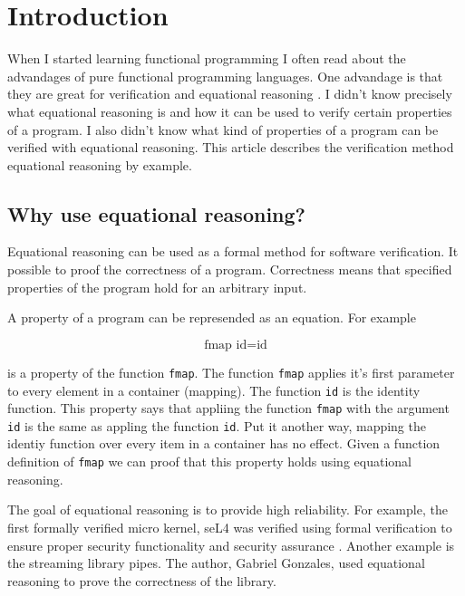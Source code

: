 \section{Introduction}
\label{sec:This}

When I started learning functional programming I often read about the advandages of pure functional programming languages. One advandage is that they are great for \gls{verification} and equational reasoning \cite{Wadler87}.
I didn't know precisely what equational reasoning is and how it can be used to verify certain properties of a program. I also didn't know what kind of properties of a program can be verified with equational reasoning.
This article describes the verification method equational reasoning by example. 

\subsection{Why use equational reasoning?}

Equational reasoning can be used as a formal method for software verification. It possible to proof the correctness of a program. Correctness means that specified properties of the program hold for an arbitrary input. 

A property of a program can be represended as an equation. For example

\begin{equation}
  \label{eq:firstfunctorlaw}
\text{fmap } \text{id}  =  \text{id}  
\end{equation}

is a property of the function \verb|fmap|. The function \verb|fmap| applies it's first parameter to every element in a container (mapping). The function \verb|id| is the identity function. This property says that appliing the function \verb|fmap| with the argument \verb|id| is the same as appling the function \verb|id|. Put it another way, mapping the identiy function over every item in a container has no effect. Given a function definition of \verb|fmap| we can proof that this property holds using equational reasoning.

The goal of equational reasoning is to provide high reliability. 
For example, the first formally verified micro kernel, seL4 was verified using formal verification to ensure proper security functionality and security assurance \cite{Klein09}.
Another example is the streaming library pipes. The author, Gabriel Gonzales, used equational reasoning to prove the correctness of the library.

